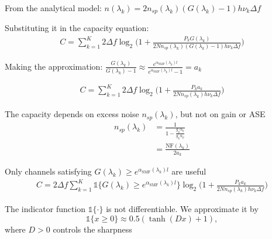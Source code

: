 \documentclass[10pt]{beamer}
\begin{document}
\begin{frame}

From the analytical model: $n(\lambda_k) = 2n_{sp}(\lambda_k)(G(\lambda_k)-1)h\nu_k\Delta f$
	
Substituting it in the capacity equation:	
\begin{align} \nonumber
	C =\sum_{k = 1}^{K} 2\Delta f\log_2\Bigg(1 + \frac{P_kG(\lambda_k)}{2Nn_{sp}(\lambda_k)(G(\lambda_k)-1)h\nu_k\Delta f}\Bigg)
\end{align}

Making the approximation: $\displaystyle\frac{G(\lambda_k)}{G(\lambda_k)-1} \approx \frac{e^{\alpha_{\text{SMF}}(\lambda_k)l}}{e^{\alpha_{\text{SMF}}(\lambda_k)l}-1} = a_k$
	
\begin{align} \nonumber
C =\sum_{k = 1}^{K} 2\Delta f\log_2\Bigg(1 + \frac{P_ka_k}{2Nn_{sp}(\lambda_k)h\nu_k\Delta f}\Bigg)
\end{align}

The capacity depends on excess noise $n_{sp}(\lambda_k)$, but not on gain or ASE
~
\begin{align} \tag{theory}
	n_{sp}(\lambda_k) &= \frac{1}{1 - \displaystyle\frac{g_p\alpha_k}{g_k\alpha_p}} \\
	&= \frac{\mathrm{NF}(\lambda_k)}{2a_k} \tag{measurement}
\end{align}
	
\end{frame}

\begin{frame}

Only channels satisfying $G(\lambda_k) \geq e^{\alpha_{\text{SMF}}(\lambda_k)l}$ are useful 
~
\begin{align} \nonumber
C =2\Delta f\sum_{k = 1}^{K} \mathds{1}\{G(\lambda_k) \geq e^{\alpha_{\text{SMF}}(\lambda_k)l}\} \log_2\Bigg(1 + \frac{P_ka_k}{2Nn_{sp}(\lambda_k)h\nu_k\Delta f}\Bigg)
\end{align}

The indicator function $\mathds{1}\{\cdot\}$ is not differentiable. We approximate it by
\begin{equation*}
	\mathds{1}\{x \geq 0\} \approx 0.5(\tanh(Dx) + 1),
\end{equation*}
where $D>0$ controls the sharpness


\end{frame}
\end{document}
